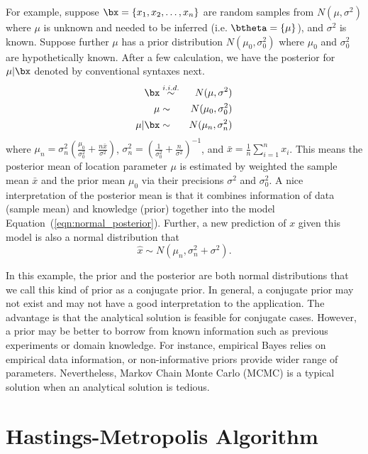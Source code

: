 For example, suppose $\bx = \{x_1, x_2, \ldots, x_n\}$ are random samples from
$N(\mu, \sigma^2)$ where $\mu$ is unknown and needed to be inferred
(i.e. $\btheta = \{\mu\}$), and
$\sigma^2$ is known. Suppose further $\mu$ has a prior distribution
$N(\mu_0, \sigma_0^2)$ where $\mu_0$ and $\sigma_0^2$ are hypothetically known.
After a few calculation, we have the posterior for $\mu | \bx$
denoted by conventional syntaxes next.
\begin{eqnarray}
\bx & \stackrel{i.i.d.}{\sim} & N(\mu, \sigma^2) \label{eqn:normal_prior} \\
\mu & \sim & N(\mu_0, \sigma_0^2) \label{eqn:normal_likelihood} \\
\mu|\bx & \sim & N(\mu_n, \sigma_n^2) \label{eqn:normal_posterior}
\end{eqnarray}
where
$\mu_n = \sigma_n^2
       \left(\frac{\mu_0}{\sigma_0^2} + \frac{n\bar{x}}{\sigma^2} \right)$,
$\sigma_n^2
 = \left(\frac{1}{\sigma_0^2} + \frac{n}{\sigma^2} \right)^{-1}$,
and $\bar{x} = \frac{1}{n} \sum_{i = 1}^n x_i$.
This means the posterior mean of location parameter $\mu$ is estimated by
weighted the sample mean $\bar{x}$ and the prior mean $\mu_0$ via their
precisions $\sigma^2$ and $\sigma_0^2$. A nice interpretation of the posterior
mean is that it combines information of data (sample mean) and knowledge (prior)
together into the model Equation~(\ref{eqn:normal_posterior}).
Further, a new prediction of $x$ given this model is also a normal
distribution that
\begin{equation}
\hat{x} \sim N(\mu_n, \sigma_n^2 + \sigma^2).
\label{eqn:normal_prediction}
\end{equation}

In this example, the prior and the posterior are both normal distributions
that we call this kind of prior as a conjugate prior.
In general, a conjugate prior may
not exist and may not have a good interpretation to the application.
The advantage is that the analytical solution is feasible for conjugate
cases. However, a prior may be better to borrow from known information such as
previous experiments or domain knowledge. For instance, empirical Bayes
relies on empirical data information, or non-informative priors provide
wider range of parameters. Nevertheless,
Markov Chain Monte Carlo (MCMC)
is a typical solution when an analytical solution is tedious.


\section{Hastings-Metropolis Algorithm}

